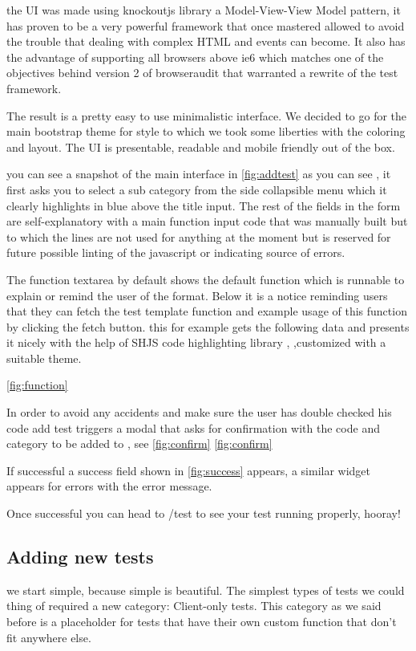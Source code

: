 the UI was made using knockoutjs \cite{knockoutjs} library a Model-View-View Model pattern, it has proven to be a very powerful framework that once mastered allowed
to avoid the trouble that dealing with complex HTML and events can become. It also has the advantage of supporting all browsers above ie6 which matches one
of the objectives behind version 2 of browseraudit that warranted a rewrite of the test framework.

The result is a pretty easy to use minimalistic interface. We decided to go for the main bootstrap theme for style to which we took some liberties
with the coloring and layout. The UI is presentable, readable and mobile friendly out of the box.

you can see a snapshot of the main interface in \ref{fig:addtest} as you can see , it first asks you to select a sub category from the side collapsible
menu which it clearly highlights in blue above the title input. The rest of the fields in the form are self-explanatory with a main function 
input code that was manually built but to which the lines are not used for anything at the moment but is reserved for future possible
linting of the javascript or indicating source of errors.

The function textarea by default shows the default function which is runnable to explain or remind the user of the format. 
Below it is a notice reminding users that they can fetch the test template function and example usage of this function by clicking the fetch
button. this for example gets the following data and presents it nicely with the help of SHJS code highlighting library , \cite{SHJS},customized with a suitable theme.

\ref{fig:function}


In order to avoid any accidents and make sure the user has double checked his code add test triggers a modal that asks for confirmation with the code
and category to be added to , see \ref{fig:confirm} 
\ref{fig:confirm}

If successful a success field shown in \ref{fig:success} appears, a similar widget appears for errors with the error message.

Once successful you can head to /test to see your test running properly, hooray!

\subsection{Adding new tests}

we start simple, because simple is beautiful. The simplest types of tests we could thing of required a new category: Client-only tests.
This category as we said before is a placeholder for tests that have their own custom function that don't fit anywhere else.

